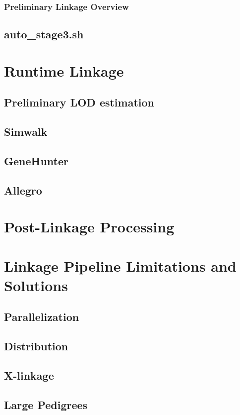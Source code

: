 \subsubsection{Preliminary Linkage Overview}

\subsection{auto\_stage3.sh}


\section{Runtime Linkage}
\subsection{Preliminary LOD estimation}
\subsection{Simwalk}
\subsection{GeneHunter}
\subsection{Allegro}

\section{Post-Linkage Processing}

\section{Linkage Pipeline Limitations and Solutions}
\subsection{Parallelization}
\subsection{Distribution}
\subsection{X-linkage}

\subsection{Large Pedigrees}
